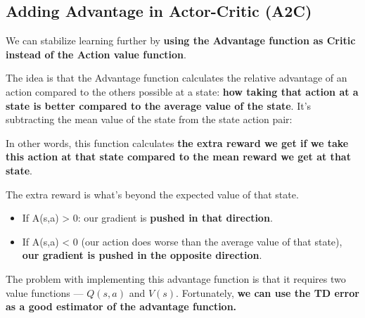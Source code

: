 \documentclass[11pt,a4paper]{article}
\begin{document}

\subsection{Adding Advantage in Actor-Critic (A2C)}\label{adding-advantage-in-actor-critic-a2c}

We can stabilize learning further by \textbf{using the Advantage function as Critic instead of the Action value function}.

The idea is that the Advantage function calculates the relative advantage of an action compared to the others possible at a state: \textbf{how taking that action at a state is better compared to the average value of the state}. It's subtracting the mean value of the state from the state action pair:


In other words, this function calculates \textbf{the extra reward we get if we take this action at that state compared to the mean reward we get at that state}.

The extra reward is what's beyond the expected value of that state.

\begin{itemize}
\tightlist
\item
  If A(s,a) \textgreater{} 0: our gradient is \textbf{pushed in that direction}.
\item
  If A(s,a) \textless{} 0 (our action does worse than the average value of that state), \textbf{our gradient is pushed in the opposite direction}.
\end{itemize}

The problem with implementing this advantage function is that it requires two value functions --- \(Q(s,a)\) and \(V(s)\). Fortunately, \textbf{we can use the TD error as a good estimator of the advantage function.}

\end{document}
